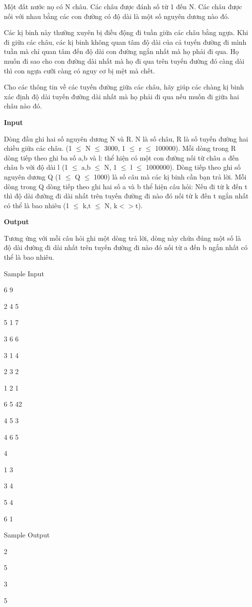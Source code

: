 



   Một đất nước nọ có N châu. Các châu được đánh số từ 1 đến N. Các châu được nối với nhau bằng các con đường có độ dài là một số nguyên dương nào đó.  

   Các kị binh này thường xuyên bị điều động đi tuần giữa các châu bằng ngựa. Khi đi giữa các châu, các kị binh không quan tâm độ dài của cả tuyến đường đi mình tuần mà chỉ quan tâm đến độ dài con đường ngắn nhất mà họ phải đi qua. Họ muốn đi sao cho con đường dài nhất mà họ đi qua trên tuyến đường đó càng dài thì con ngựa cưỡi càng có nguy cơ bị mệt mà chết.  

   Cho các thông tin về các tuyến đường giữa các châu, hãy giúp các chàng kị binh xác định độ dài tuyến đường dài nhất mà họ phải đi qua nếu muốn đi giữa hai châu nào đó.  

\textbf{    Input   }

   Dòng đầu ghi hai số nguyên dương N và R. N là số châu, R là số tuyến đường hai chiều giữa các châu. (1 $\le$ N $\le$ 3000, 1 $\le$ r $\le$ 100000). Mỗi dòng trong R dòng tiếp theo ghi ba số a,b và l: thể hiện có một con đường nối từ châu a đến châu b với độ dài l (1 $\le$ a,b $\le$ N, 1 $\le$ l $\le$ 1000000). Dòng tiếp theo ghi số nguyên dương Q (1 $\le$ Q $\le$ 1000) là số câu mà các kị binh cần bạn trả lời. Mỗi dòng trong Q dòng tiếp theo ghi hai số a và b thể hiện câu hỏi: Nếu đi từ k đến t thì độ dài đường đi dài nhất trên tuyến đường đi nào đó nối từ k đến t ngắn nhất có thể là bao nhiêu (1 $\le$ k,t $\le$ N, k$<$$>$t).  

\textbf{    Output   }

   Tương ứng với mỗi câu hỏi ghi một dòng trả lời, dòng này chứa đúng một số là độ dài đường đi dài nhất trên tuyến đường đi nào đó nối từ a đến b ngắn nhất có thể là bao nhiêu.  

   Sample Input  

   6 9  

   2 4 5  

   5 1 7  

   3 6 6  

   3 1 4  

   2 3 2  

   1 2 1  

   6 5 42  

   4 5 3  

   4 6 5  

   4  

   1 3  

   3 4  

   5 4  

   6 1  

   Sample Output  

   2  

   5  

   3  

   5  
